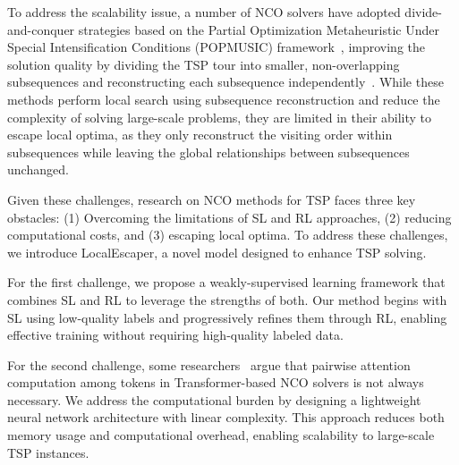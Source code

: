 To address the scalability issue, a number of NCO solvers have adopted divide-and-conquer strategies based on the Partial Optimization Metaheuristic Under Special Intensification Conditions (POPMUSIC) framework~\cite{taillard2019popmusic}, improving the solution quality by dividing the TSP tour into smaller, non-overlapping subsequences and reconstructing each subsequence independently~\cite{cheng2023select,luo2023neural,ye2024glop,zheng2024udc}. 
While these methods perform local search using subsequence reconstruction and reduce the complexity of solving large-scale problems, they are limited in their ability to escape local optima, as they only reconstruct the visiting order within subsequences while leaving the global relationships between subsequences unchanged. 

Given these challenges, research on NCO methods for TSP faces three key obstacles: (1) Overcoming the limitations of SL and RL approaches, (2) reducing computational costs, and (3) escaping  local optima.
To address these challenges, we introduce LocalEscaper, a novel model designed to enhance TSP solving. 

For the first challenge, %
we propose a weakly-supervised learning framework that combines SL and RL to leverage the strengths of both. Our method begins with SL using low-quality labels and progressively refines them through RL, enabling effective training without requiring high-quality labeled data.

For the second challenge, some researchers~\cite{yang2023memory, luo2024self} argue that pairwise attention computation among tokens in Transformer-based NCO solvers is not always necessary. %
We address the computational burden by designing a lightweight neural network architecture with linear complexity. %
This approach reduces both memory usage and computational overhead, enabling scalability to large-scale TSP instances.

